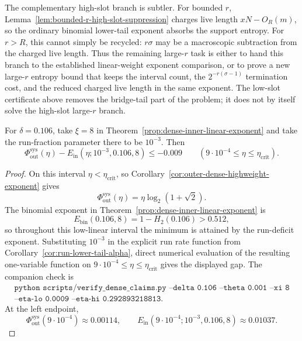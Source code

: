 The complementary high-slot branch is subtler.  For bounded \(r\), Lemma~\ref{lem:bounded-r-high-slot-suppression}
charges live length \(xN-O_R(m)\), so the ordinary binomial lower-tail exponent absorbs the support entropy.  For
\(r>R\), this cannot simply be recycled: \(r\sigma\) may be a macroscopic subtraction from the charged live length.
Thus the remaining large-\(r\) task is either to hand this branch to the established linear-weight exponent
comparison, or to prove a new large-\(r\) entropy bound that keeps the interval count, the \(2^{-r(\sigma-1)}\)
termination cost, and the reduced charged live length in the same exponent.  The low-slot certificate above removes
the bridge-tail part of the problem; it does not by itself solve the high-slot large-\(r\) branch.

\begin{lemma}
\label{lem:low-linear-handoff-0106}
For \(\delta=0.106\), take \(\xi=8\) in Theorem~\ref{prop:dense-inner-linear-exponent} and take the run-fraction
parameter there to be \(10^{-3}\).  Then
\[
\Phi_{\mathrm{out}}^{\mathrm{sys}}(\eta)
-
E_{\mathrm{in}}(\eta;10^{-3},0.106,8)
\le -0.009
\qquad
(9\cdot10^{-4}\le \eta\le \eta_{\mathrm{crit}}).
\]
\end{lemma}

\begin{proof}
On this interval \(\eta<\eta_{\mathrm{crit}}\), so Corollary~\ref{cor:outer-dense-highweight-exponent} gives
\[
\Phi_{\mathrm{out}}^{\mathrm{sys}}(\eta)=\eta\log_2(1+\sqrt2).
\]
The binomial exponent in Theorem~\ref{prop:dense-inner-linear-exponent} is
\[
E_{\mathrm{bin}}(0.106,8)=1-H_2(0.106)>0.512,
\]
so throughout this low-linear interval the minimum is attained by the run-deficit exponent.  Substituting
\(10^{-3}\) in the explicit run rate function from Corollary~\ref{cor:run-lower-tail-alpha}, direct numerical
evaluation of the resulting one-variable function on
\(9\cdot10^{-4}\le\eta\le\eta_{\mathrm{crit}}\) gives the displayed gap.  The
companion check is
\[
\begin{gathered}
\texttt{python scripts/verify\_dense\_claims.py --delta 0.106 --theta 0.001 --xi 8}\\
\texttt{--eta-lo 0.0009 --eta-hi 0.292893218813}.
\end{gathered}
\]
At the left endpoint,
\[
\Phi_{\mathrm{out}}^{\mathrm{sys}}(9\cdot10^{-4})\approx0.00114,
\qquad
E_{\mathrm{in}}(9\cdot10^{-4};10^{-3},0.106,8)\approx0.01037.
\]
\end{proof}

